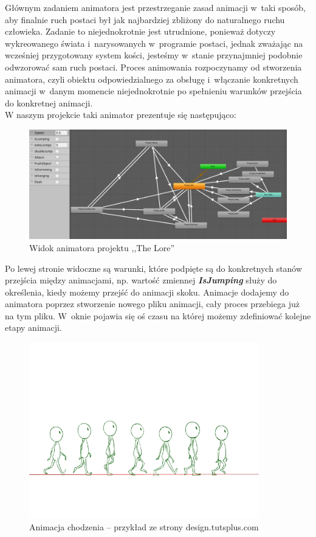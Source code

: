 \documentclass[oneside,polski,logo]{amuthesis}
\begin{document}
 \newpage
Głównym zadaniem animatora jest przestrzeganie zasad animacji w~taki sposób, aby finalnie ruch postaci był jak najbardziej zbliżony do naturalnego ruchu człowieka.
Zadanie to niejednokrotnie jest utrudnione, ponieważ dotyczy wykreowanego świata i~narysowanych w~programie postaci, jednak zważając na wcześniej przygotowany system kości, jesteśmy w~stanie przynajmniej podobnie odwzorować sam ruch postaci. 
Proces animowania rozpoczynamy od stworzenia animatora, czyli obiektu odpowiedzialnego za obsługę i~włączanie konkretnych animacji w~danym momencie niejednokrotnie po spełnieniu warunków przejścia do konkretnej animacji. \cite{animation1} \\
W naszym projekcie taki animator prezentuje się następująco:

\begin{figure}[h]
	\centering
	\includegraphics[width=13cm]{images/kozubal/animator.jpg}
	\caption{Widok animatora projektu ,,The Lore''}
\end{figure}

Po lewej stronie widoczne są warunki, które podpięte są do konkretnych stanów przejścia między animacjami, np. wartość zmiennej \textbf{\textit{IsJumping}} służy do określenia, kiedy możemy przejść do animacji skoku. Animacje dodajemy do animatora poprzez stworzenie nowego pliku animacji, cały proces przebiega już na tym pliku. W~oknie pojawia się oś czasu na której możemy zdefiniować kolejne etapy animacji.\\

\begin{figure}[h]
	\centering
	\includegraphics[width=10cm]{images/kozubal/walkingAnimation.jpg}
	\caption{Animacja chodzenia – przykład ze strony design.tutsplus.com \cite{animation2}}
\end{figure}
\end{document}
